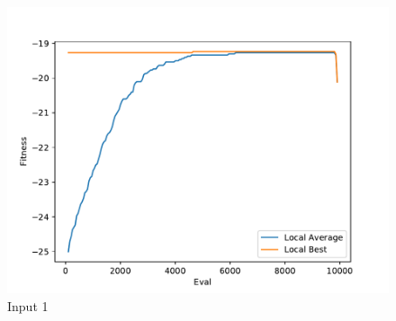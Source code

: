 \documentclass{standalone}
\begin{document}
\begin{figure}[!htb]
	\caption{Input 1}
	\label{fig:graph_1055}
	\includegraphics[width=\textwidth]{../graphs/graphs/1055.pdf}
\end{figure}
\end{document}
